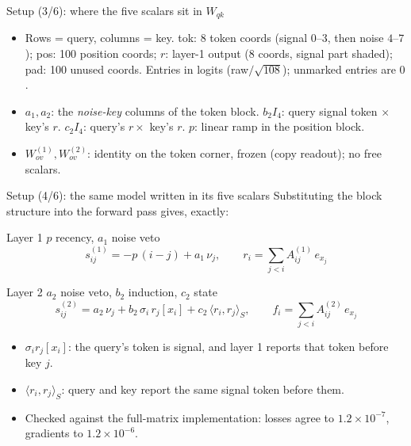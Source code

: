 \documentclass[aspectratio=169,11pt]{beamer}
\newcommand{\1}{\mathbf{1}}
\begin{document}
\begin{frame}{Setup (3/6): where the five scalars sit in $W_{qk}$}
\begin{center}
\begin{tikzpicture}[x=0.7cm,y=0.7cm,font=\scriptsize]
\end{tikzpicture}
\end{center}
\vspace{-0.3em}
\begin{itemize}
\item Rows = query, columns = key. tok: 8 token coords (signal $0$--$3$, then noise $4$--$7$); pos: 100 position coords;
$r$: layer-1 output (8 coords, signal part shaded); pad: 100 unused coords. Entries in logits (raw$/\sqrt{108}$); unmarked entries are $0$.
\item $a_1,a_2$: the \emph{noise-key} columns of the token block. $b_2I_4$: query signal token $\times$ key's $r$.
$c_2I_4$: query's $r\times$ key's $r$. $p$: linear ramp in the position block.
\item $W^{(1)}_{ov},W^{(2)}_{ov}$: identity on the token corner, frozen (copy readout); no free scalars.
\end{itemize}
\end{frame}

\begin{frame}{Setup (4/6): the same model written in its five scalars}
\small
Substituting the block structure into the forward pass gives, exactly:
\begin{block}{Layer 1 \hfill $p$ recency, $a_1$ noise veto}
\vspace{-0.5em}
\[
s^{(1)}_{ij}=-p\,(i-j)+a_1\,\nu_j,\qquad r_i=\sum_{j<i}A^{(1)}_{ij}\,e_{x_j}
\]
\end{block}
\begin{block}{Layer 2 \hfill $a_2$ noise veto, $b_2$ induction, $c_2$ state}
\vspace{-0.5em}
\[
s^{(2)}_{ij}=a_2\,\nu_j+b_2\,\sigma_i\,r_j[x_i]+c_2\,\langle r_i,r_j\rangle_S,\qquad f_i=\sum_{j<i}A^{(2)}_{ij}\,e_{x_j}
\]
\end{block}
\begin{itemize}
\item $\sigma_i r_j[x_i]$: the query's token is signal, and layer 1 reports that token before key $j$.
\item $\langle r_i,r_j\rangle_S$: query and key report the same signal token before them.
\item Checked against the full-matrix implementation: losses agree to $1.2\times10^{-7}$, gradients to $1.2\times10^{-6}$.
\end{itemize}
\end{frame}
\end{document}
